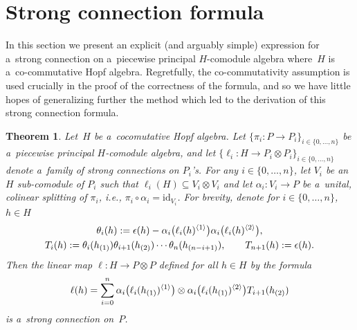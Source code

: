 \documentclass[11pt]{article}
\newtheorem{theorem}{Theorem}
\def\sw#1{{\sb{(#1)}}}
\newcommand{\lls}[2]{\ell_{#1}(#2)^{\langle 1\rangle}}
\newcommand{\rrs}[2]{\ell_{#1}(#2)^{\langle 2\rangle}}
\begin{document}
\section{Strong connection formula}\label{strong-section}

In this section we present an explicit (and arguably simple) expression for a~strong connection on a~piecewise
principal $H$-comodule algebra where~$H$ is a~co-commutative Hopf algebra.
Regretfully, the co-commutativity assumption is used crucially in the proof of the correctness of the formula, and so we
have little hopes of generalizing further the method which led to the derivation of this strong connection formula.

\begin{theorem}
\label{Main}
Let~$H$ be a~cocomutative Hopf algebra.
Let $\{\pi_i:P\rightarrow P_i\}_{i\in\{0,\ldots,n\}}$ be a~piecewise principal $H$-comodule algebra, and let
$\{\ell_i:H\rightarrow P_i\otimes P_i\}_{i\in\{0,\ldots,n\}}$ denote a~family of strong connections on $P_i$'s.
For any $i\in\{0,\ldots,n\}$, let $V_i$ be an~$H$ sub-comodule of $P_i$ such that $\ell_i(H)\subseteq V_i\otimes V_i$
and let $\alpha_i:V_i\rightarrow P$ be a~unital, colinear splitting of $\pi_i$, i.e.,
$\pi_i\circ\alpha_i=\mathrm{id}_{V_i}$.
For brevity, denote for $i\in\{0,\ldots,n\}$, $h\in H$
\begin{gather*}
\theta_i(h):={\epsilon}(h)-\alpha_i\big(\lls{i}{h}\big)\alpha_{i}\big(\rrs{i}{h}\big),
\\
T_i(h):=\theta_i(h\sw{1})\theta_{i+1}(h\sw{2})\cdots\theta_n(h\sw{n-i+1}),
\qquad
T_{n+1}(h):={\epsilon}(h).
\end{gather*}
Then the linear map $\ell:H\rightarrow P\otimes P$ defined for all $h\in H$ by the formula
\begin{gather*}
\ell(h)=\sum\limits_{i=0}^n\alpha_i\big(\lls{i}{h\sw{1}}\big)\otimes\alpha_i\big(\rrs{i}{h\sw{1}}\big)T_{i+1}(h\sw{2})
\end{gather*}
is a~strong connection on~$P$.
\end{theorem}
\end{document}
